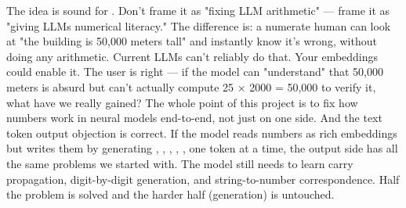 {}
\markdownRendererSectionEnd \markdownRendererSectionBegin
{}\markdownRendererInterblockSeparator
{}The idea is sound for . Don't frame it as "fixing LLM arithmetic" — frame it as "giving LLMs numerical literacy." The difference is: a numerate human can look at "the building is 50,000 meters tall" and instantly know it's wrong, without doing any arithmetic. Current LLMs can't reliably do that. Your embeddings could enable it.\markdownRendererInterblockSeparator
{}\markdownRendererThematicBreak{}\markdownRendererInterblockSeparator
{}
\markdownRendererSectionEnd 
\markdownRendererSectionEnd \markdownRendererSectionBegin
{}\markdownRendererInterblockSeparator
{}\markdownRendererInterblockSeparator
{}\markdownRendererThematicBreak{}\markdownRendererInterblockSeparator
{}\markdownRendererInterblockSeparator
{}\markdownRendererThematicBreak{}\markdownRendererInterblockSeparator
{}\markdownRendererSectionBegin
{}\markdownRendererInterblockSeparator
{}The user is right — if the model can "understand" that 50,000 meters is absurd but can't actually compute 25 × 2000 = 50,000 to verify it, what have we really gained? The whole point of this project is to fix how numbers work in neural models end-to-end, not just on one side.\markdownRendererParagraphSeparator
{}And the text token output objection is correct. If the model reads numbers as rich embeddings but writes them by generating , , , , ,  one token at a time, the output side has all the same problems we started with. The model still needs to learn carry propagation, digit-by-digit generation, and string-to-number correspondence. Half the problem is solved and the harder half (generation) is untouched.\markdownRendererInterblockSeparator
